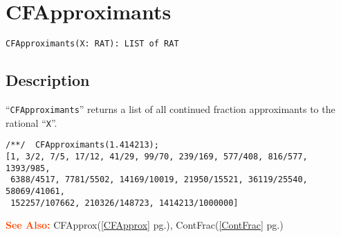 \documentclass[a4paper]{mybook}
\newenvironment{command}{}{} %
\newcommand\SeeAlso{\par\textcolor{OrangeRed}{\textbf{\large See Also: }}}
\begin{document}
\section{CFApproximants}
\label{CFApproximants}
\begin{command} %


\begin{Verbatim}[label=syntax, rulecolor=\color{MidnightBlue},
frame=single]
CFApproximants(X: RAT): LIST of RAT
\end{Verbatim}


\subsection*{Description}

``\verb&CFApproximants&'' returns a list of all continued fraction approximants
to the rational ``\verb&X&''.
\begin{Verbatim}[label=example, rulecolor=\color{PineGreen}, frame=single]
/**/  CFApproximants(1.414213);
[1, 3/2, 7/5, 17/12, 41/29, 99/70, 239/169, 577/408, 816/577, 1393/985,
 6388/4517, 7781/5502, 14169/10019, 21950/15521, 36119/25540, 58069/41061,
 152257/107662, 210326/148723, 1414213/1000000]
\end{Verbatim}


\SeeAlso %
  CFApprox(\ref{CFApprox} pg.\pageref{CFApprox}), 
    ContFrac(\ref{ContFrac} pg.\pageref{ContFrac})
\end{command} %
\end{document}
